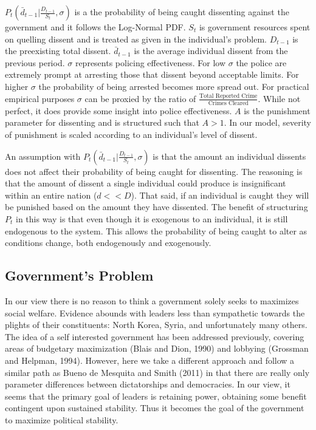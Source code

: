 \documentclass[12pt]{article}
\begin{document}
\begin{spacing}{1.5}
$ P_t \left( \bar{d}_{t-1} \Bigg|\frac{D_{t-1}}{S_t},\sigma \right)$ is a the probability of being caught dissenting against the government and it follows the Log-Normal PDF. $S_t$ is government resources spent on quelling dissent and is treated as given in the individual's problem. $D_{t-1}$ is the preexisting total dissent. $\bar{d}_{t-1}$ is the average individual dissent from the previous period. $\sigma$ represents policing effectiveness. For low $\sigma$ the police are extremely prompt at arresting those that dissent beyond acceptable limits. For higher $\sigma$ the probability of being arrested becomes more spread out. For practical empirical purposes $\sigma$ can be proxied by the ratio of $\frac{\text{Total Reported Crime}}{\text{Crimes Cleared}}$. While not perfect, it does provide some insight into police effectiveness. $A$ is the punishment parameter for dissenting and is structured such that $A>1$. In our model, severity of punishment is scaled according to an individual's level of dissent. 

An assumption with $P_t \left( \bar{d}_{t-1} \Bigg|\frac{D_{t-1}}{S_t},\sigma \right)$ is that the amount an individual dissents does not affect their probability of being caught for dissenting. The reasoning is that the amount of dissent a single individual could produce is insignificant within an entire nation ($d<<D$). That said, if an individual is caught they will be punished based on the amount they have dissented. The benefit of structuring $P_t$ in this way is that even though it is exogenous to an individual, it is still endogenous to the system. This allows the probability of being caught to alter as conditions change, both endogenously and exogenously.    

\subsection{Government's Problem} 

In our view there is no reason to think a government solely seeks to maximizes social welfare.  Evidence abounds with leaders less than sympathetic towards the plights of their constituents: North Korea, Syria, and unfortunately many others. The idea of a self interested government has been addressed previously, covering areas of budgetary maximization (Blais and Dion, 1990) and lobbying (Grossman and Helpman, 1994). However, here we take a different approach and follow a similar path as Bueno de Mesquita and Smith (2011) in that there are really only parameter differences between dictatorships and democracies. In our view, it seems that the primary goal of leaders is retaining power, obtaining some benefit contingent upon sustained stability. Thus it becomes the goal of the government to maximize political stability. 



\end{spacing}
\end{document}
